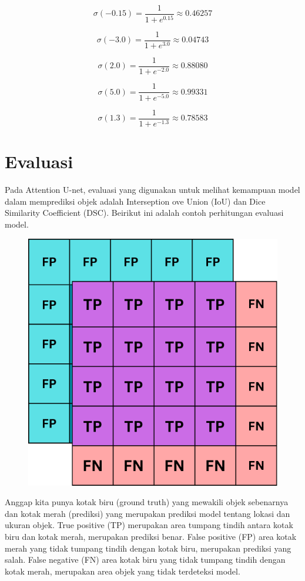 \[
\sigma(-0.15) = \frac{1}{1 + e^{0.15}} \approx 0.46257
\]

\[
\sigma(-3.0) = \frac{1}{1 + e^{3.0}} \approx 0.04743
\]

\[
\sigma(2.0) = \frac{1}{1 + e^{-2.0}} \approx 0.88080
\]

\[
\sigma(5.0) = \frac{1}{1 + e^{-5.0}} \approx 0.99331
\]

\[
\sigma(1.3) = \frac{1}{1 + e^{-1.3}} \approx 0.78583
\]



\section{Evaluasi}
 
 \noindent Pada Attention U-net, evaluasi yang digunakan untuk melihat kemampuan model dalam memprediksi objek adalah Interseption ove Union (IoU) dan Dice Similarity Coefficient (DSC). Beirikut ini adalah contoh perhitungan evaluasi model.
 
 \begin{figure}[H]
 	\centering
 	\includegraphics[scale=.2]{gambar/lampiran/prediksi.png}
 \end{figure}    
 
 \noindent Anggap kita punya kotak biru (ground truth) yang mewakili objek sebenarnya dan kotak merah (prediksi) yang merupakan prediksi model tentang lokasi dan ukuran objek. True positive (TP) merupakan area tumpang tindih antara kotak biru dan kotak merah, merupakan prediksi benar. False positive (FP) area kotak merah yang tidak tumpang tindih dengan kotak biru, merupakan prediksi yang salah. False negative (FN) area kotak biru yang tidak tumpang tindih dengan kotak merah, merupakan area objek yang tidak terdeteksi model.    
 
